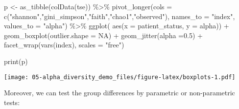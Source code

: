 \documentclass[
  oneside]{book}
\newenvironment{Shaded}{\begin{snugshade}}{\end{snugshade}}
\newcommand{\AttributeTok}[1]{\textcolor[rgb]{0.77,0.63,0.00}{#1}}
\newcommand{\ConstantTok}[1]{\textcolor[rgb]{0.00,0.00,0.00}{#1}}
\newcommand{\FloatTok}[1]{\textcolor[rgb]{0.00,0.00,0.81}{#1}}
\newcommand{\FunctionTok}[1]{\textcolor[rgb]{0.00,0.00,0.00}{#1}}
\newcommand{\NormalTok}[1]{#1}
\newcommand{\OtherTok}[1]{\textcolor[rgb]{0.56,0.35,0.01}{#1}}
\newcommand{\SpecialCharTok}[1]{\textcolor[rgb]{0.00,0.00,0.00}{#1}}
\newcommand{\StringTok}[1]{\textcolor[rgb]{0.31,0.60,0.02}{#1}}
\begin{document}
\begin{Shaded}
\begin{Highlighting}[]
\NormalTok{p }\OtherTok{\textless{}{-}} \FunctionTok{as\_tibble}\NormalTok{(}\FunctionTok{colData}\NormalTok{(tse)) }\SpecialCharTok{\%\textgreater{}\%} 
  \FunctionTok{pivot\_longer}\NormalTok{(}\AttributeTok{cols =} \FunctionTok{c}\NormalTok{(}\StringTok{"shannon"}\NormalTok{,}\StringTok{"gini\_simpson"}\NormalTok{,}\StringTok{"faith"}\NormalTok{,}\StringTok{"chao1"}\NormalTok{,}\StringTok{"observed"}\NormalTok{), }\AttributeTok{names\_to =} \StringTok{"index"}\NormalTok{, }\AttributeTok{values\_to =} \StringTok{"alpha"}\NormalTok{) }\SpecialCharTok{\%\textgreater{}\%} 
  \FunctionTok{ggplot}\NormalTok{( }\FunctionTok{aes}\NormalTok{(}\AttributeTok{x =}\NormalTok{ patient\_status, }\AttributeTok{y =}\NormalTok{ alpha)) }\SpecialCharTok{+} 
  \FunctionTok{geom\_boxplot}\NormalTok{(}\AttributeTok{outlier.shape =} \ConstantTok{NA}\NormalTok{) }\SpecialCharTok{+}
  \FunctionTok{geom\_jitter}\NormalTok{(}\AttributeTok{alpha =}\FloatTok{0.5}\NormalTok{) }\SpecialCharTok{+}
  \FunctionTok{facet\_wrap}\NormalTok{(}\FunctionTok{vars}\NormalTok{(index), }\AttributeTok{scales =} \StringTok{"free"}\NormalTok{)}

\FunctionTok{print}\NormalTok{(p)}
\end{Highlighting}
\end{Shaded}

\texttt{[image: 05-alpha\_diversity\_demo\_files/figure-latex/boxplots-1.pdf]}

Moreover, we can test the group differences by parametric or non-parametric tests:
\end{document}
